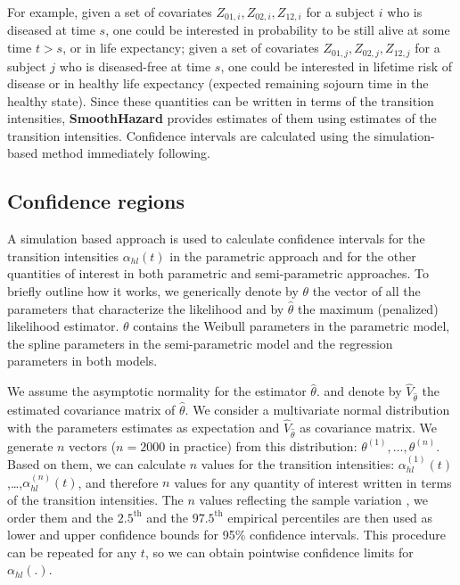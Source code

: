 \documentclass{article}
\newcommand{\pkg}[1]{{\bf #1}}
\begin{document}
For example, given a set of covariates $Z_{01,i},Z_{02,i},Z_{12,i}$
for a subject $i$ who is diseased at time $s$, one could be interested
in probability to be still alive at some time $t>s$, or in life
expectancy; given a set of covariates $Z_{01,j},Z_{02,j},Z_{12,j}$ for
a subject $j$ who is diseased-free at time $s$, one could be
interested in lifetime risk of disease or in healthy life expectancy
(expected remaining sojourn time in the healthy state). 
Since these quantities
can be written in terms of the transition intensities,
\pkg{SmoothHazard} provides estimates of them using estimates of the
transition intensities. Confidence intervals are
calculated using the simulation-based method immediately following.

\subsection{Confidence regions}
\label{sec-4-1}
\label{sec:CI}

A simulation based approach \citep{Mandel_2013} is used to calculate
confidence intervals for the transition intensities $\alpha_{hl}(t)$
in the parametric approach and for the other quantities of interest
in both parametric and semi-parametric approaches. 
To briefly outline how
it works, we generically denote by $\theta$ the vector of all the
parameters that characterize the likelihood and by $\hat\theta$ the
maximum (penalized) likelihood estimator.
$\theta$ contains the Weibull parameters in the parametric model,
the spline parameters in the semi-parametric model
and the regression parameters in both models. 

We assume the asymptotic normality for the estimator $\hat{\theta}$.
and denote by $\hat{V}_{\hat{\theta}}$ the estimated covariance matrix
of $\hat{\theta}$. We consider a multivariate normal distribution with
the parameters estimates as expectation and $\hat{V}_{\hat{\theta}}$
as covariance matrix. We generate $n$ vectors ($n=2000$ in practice)
from this distribution: $\theta^{(1)},\ldots,\theta^{(n)}$.  Based on
them, we can calculate $n$ values for the transition intensities:
$\alpha_{hl}^{(1)}(t)$,\ldots,$\alpha_{hl}^{(n)}(t)$, and therefore
$n$ values for any quantity of interest written in terms of the
transition intensities.  The $n$ values reflecting the sample
variation \citep{Aalen_Farewell_De_Angelis_Day_Gill_1997}, we order
them and the $2.5^{\text{th}}$ and the $97.5^{\text{th}}$ empirical
percentiles are then used as lower and upper confidence bounds for
95\% confidence intervals.  This procedure can be repeated for any
$t$, so we can obtain pointwise confidence limits for
${\alpha}_{hl}(.)$.
\end{document}

